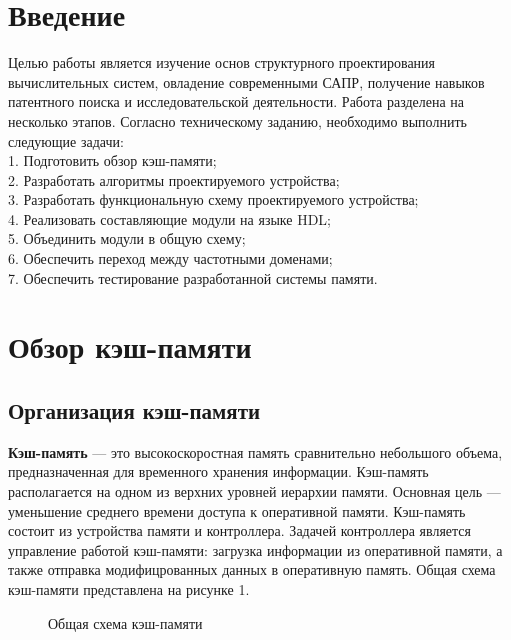 \documentclass[13pt]{article}
\begin{document}
	\section*{Введение}
	Целью работы является изучение основ структурного проектирования вычислительных систем, овладение современными САПР, получение навыков патентного поиска и исследовательской деятельности. Работа разделена на несколько этапов. Согласно техническому заданию, необходимо выполнить следующие задачи:\\
	1. Подготовить обзор кэш-памяти;\\
	2. Разработать алгоритмы проектируемого устройства;\\
	3. Разработать функциональную схему проектируемого устройства;\\
	4. Реализовать составляющие модули на языке HDL;\\
	5. Объединить модули в общую схему;\\
	6. Обеспечить переход между частотными доменами;\\
	7. Обеспечить тестирование разработанной системы памяти.
	\newpage
	\section{Обзор кэш-памяти}
	\subsection{Организация кэш-памяти}
	\textbf{Кэш-память} --- это высокоскоростная память сравнительно небольшого объема, предназначенная для временного хранения информации. Кэш-память располагается на одном из верхних уровней иерархии памяти. Основная цель --- уменьшение среднего времени доступа к оперативной памяти. 
	Кэш-память состоит из устройства памяти и контроллера. Задачей контроллера является управление работой кэш-памяти: загрузка информации из оперативной памяти, а также отправка модифицрованных данных в оперативную память. Общая схема кэш-памяти представлена на рисунке 1.
	\begin{figure}[h!]
		\caption{Общая схема кэш-памяти}
	\end{figure}
	
\end{document}
